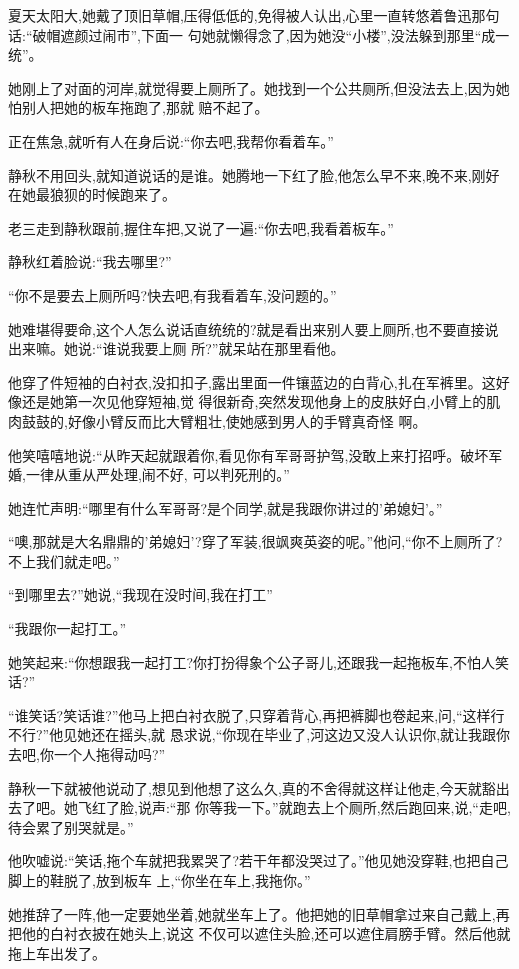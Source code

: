 ﻿\documentclass[12pt]{article}
\begin{document}
夏天太阳大,她戴了顶旧草帽,压得低低的,免得被人认出,心里一直转悠着鲁迅那句话:``破帽遮颜过闹市'',下面一
句她就懒得念了,因为她没``小楼'',没法躲到那里``成一统''。

她刚上了对面的河岸,就觉得要上厕所了。她找到一个公共厕所,但没法去上,因为她怕别人把她的板车拖跑了,那就
赔不起了。

正在焦急,就听有人在身后说:``你去吧,我帮你看着车。''

静秋不用回头,就知道说话的是谁。她腾地一下红了脸,他怎么早不来,晚不来,刚好在她最狼狈的时候跑来了。

老三走到静秋跟前,握住车把,又说了一遍:``你去吧,我看着板车。''

静秋红着脸说:``我去哪里?''

``你不是要去上厕所吗?快去吧,有我看着车,没问题的。''

她难堪得要命,这个人怎么说话直统统的?就是看出来别人要上厕所,也不要直接说出来嘛。她说:``谁说我要上厕
所?''就呆站在那里看他。

他穿了件短袖的白衬衣,没扣扣子,露出里面一件镶蓝边的白背心,扎在军裤里。这好像还是她第一次见他穿短袖,觉
得很新奇,突然发现他身上的皮肤好白,小臂上的肌肉鼓鼓的,好像小臂反而比大臂粗壮,使她感到男人的手臂真奇怪
啊。

他笑嘻嘻地说:``从昨天起就跟着你,看见你有军哥哥护驾,没敢上来打招呼。破坏军婚,一律从重从严处理,闹不好,
可以判死刑的。''

她连忙声明:``哪里有什么军哥哥?是个同学,就是我跟你讲过的'弟媳妇'。''

``噢,那就是大名鼎鼎的'弟媳妇'?穿了军装,很飒爽英姿的呢。''他问,``你不上厕所了?不上我们就走吧。''

``到哪里去?''她说,``我现在没时间,我在打工\myrule ''

``我跟你一起打工。''

她笑起来:``你想跟我一起打工?你打扮得象个公子哥儿,还跟我一起\myrule 拖板车,不怕人笑话?''

``谁笑话?笑话谁?''他马上把白衬衣脱了,只穿着背心,再把裤脚也卷起来,问,``这样行不行?''他见她还在摇头,就
恳求说,``你现在毕业了,河这边又没人认识你,就让我跟你去吧,你一个人拖得动吗?''

静秋一下就被他说动了,想见到他想了这么久,真的不舍得就这样让他走,今天就豁出去了吧。她飞红了脸,说声:``那
你等我一下。''就跑去上个厕所,然后跑回来,说,``走吧,待会累了别哭就是。''

他吹嘘说:``笑话,拖个车就把我累哭了?若干年都没哭过了。''他见她没穿鞋,也把自己脚上的鞋脱了,放到板车
上,``你坐在车上,我拖你。''

她推辞了一阵,他一定要她坐着,她就坐车上了。他把她的旧草帽拿过来自己戴上,再把他的白衬衣披在她头上,说这
不仅可以遮住头脸,还可以遮住肩膀手臂。然后他就拖上车出发了。
\end{document}
